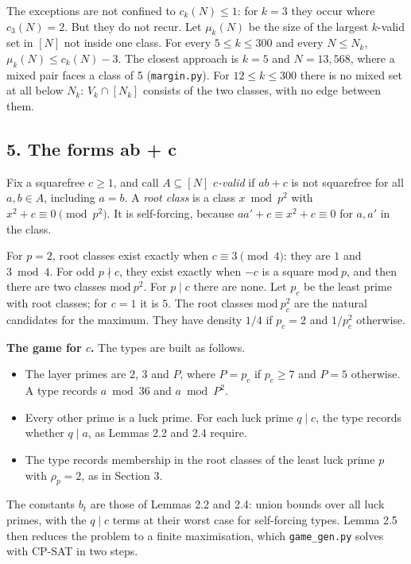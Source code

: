 \documentclass[
  11pt,
]{article}
\providecommand{\tightlist}{%
  \setlength{\itemsep}{0pt}\setlength{\parskip}{0pt}}
\begin{document}
The exceptions are not confined to \(c_k(N) \le 1\): for \(k = 3\) they
occur where \(c_3(N) = 2\). But they do not recur. Let \(\mu_k(N)\) be
the size of the largest \(k\)-valid set in \([N]\) not inside one class.
For every \(5 \le k \le 300\) and every \(N \le N_k\),
\(\mu_k(N) \le c_k(N) - 3\). The closest approach is \(k = 5\) and
\(N = 13{,}568\), where a mixed pair faces a class of 5
(\texttt{margin.py}). For \(12 \le k \le 300\) there is no mixed set at
all below \(N_k\): \(V_k \cap [N_k]\) consists of the two classes, with
no edge between them.

\subsection{5. The forms ab + c}

Fix a squarefree \(c \ge 1\), and call \(A \subseteq [N]\)
\emph{\(c\)-valid} if \(ab + c\) is not squarefree for all
\(a, b \in A\), including \(a = b\). A \emph{root class} is a class
\(x \bmod p^2\) with \(x^2 + c \equiv 0 \pmod{p^2}\). It is
self-forcing, because \(aa' + c \equiv x^2 + c \equiv 0\) for \(a, a'\)
in the class.

For \(p = 2\), root classes exist exactly when \(c \equiv 3 \pmod{4}\):
they are \(1\) and \(3 \bmod 4\). For odd \(p \nmid c\), they exist
exactly when \(-c\) is a square \(\mathrm{mod}\ p\), and then there are
two classes \(\mathrm{mod}\ p^2\). For \(p \mid c\) there are none. Let
\(p_c\) be the least prime with root classes; for \(c = 1\) it is \(5\).
The root classes \(\mathrm{mod}\ p_c^2\) are the natural candidates for
the maximum. They have density \(1/4\) if \(p_c = 2\) and \(1/p_c^2\)
otherwise.

\textbf{The game for \(c\).} The types are built as follows.

\begin{itemize}
\tightlist
\item
  The layer primes are \(2\), \(3\) and \(P\), where \(P = p_c\) if
  \(p_c \ge 7\) and \(P = 5\) otherwise. A type records \(a \bmod 36\)
  and \(a \bmod P^2\).
\item
  Every other prime is a luck prime. For each luck prime \(q \mid c\),
  the type records whether \(q \mid a\), as Lemmas 2.2 and 2.4 require.
\item
  The type records membership in the root classes of the least luck
  prime \(p\) with \(\rho_p = 2\), as in Section 3.
\end{itemize}

The constants \(b_t\) are those of Lemmas 2.2 and 2.4: union bounds over
all luck primes, with the \(q \mid c\) terms at their worst case for
self-forcing types. Lemma 2.5 then reduces the problem to a finite
maximisation, which \texttt{game\_gen.py} solves with CP-SAT in two
steps.
\end{document}
